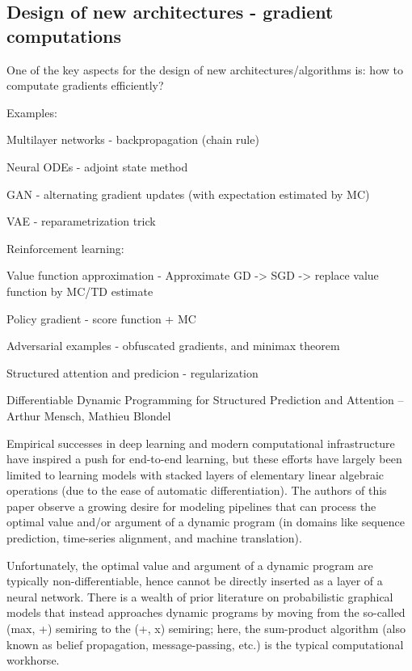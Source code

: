 \documentclass[english]{article}
\begin{document}
\eenum

\subsection{Design of new architectures - gradient computations}
%
\bitem
\item One of the key aspects for the design of new architectures/algorithms is: how to computate gradients efficiently?

\item Examples:

\item Multilayer networks - backpropagation (chain rule)

\item Neural ODEs - adjoint state method

\item GAN - alternating gradient updates (with expectation estimated by MC)

\item VAE - reparametrization trick

\item Reinforcement learning: 

\bitem 
\item
Value function approximation - Approximate GD -> SGD -> replace value function by MC/TD estimate
\item
Policy gradient - score function + MC
\eitem 

\item Adversarial examples - obfuscated gradients, and minimax theorem


\item Structured attention and predicion - regularization

Differentiable Dynamic Programming for Structured Prediction and Attention – Arthur Mensch, Mathieu Blondel

Empirical successes in deep learning and modern computational infrastructure have inspired a push for end-to-end learning, but these efforts have largely been limited to learning models with stacked layers of elementary linear algebraic operations (due to the ease of automatic differentiation). The authors of this paper observe a growing desire for modeling pipelines that can process the optimal value and/or argument of a dynamic program (in domains like sequence prediction, time-series alignment, and machine translation).

Unfortunately, the optimal value and argument of a dynamic program are typically non-differentiable, hence cannot be directly inserted as a layer of a neural network. There is a wealth of prior literature on probabilistic graphical models that instead approaches dynamic programs by moving from the so-called (max, +) semiring to the (+, x) semiring; here, the sum-product algorithm (also known as belief propagation, message-passing, etc.) is the typical computational workhorse.
\end{document}
